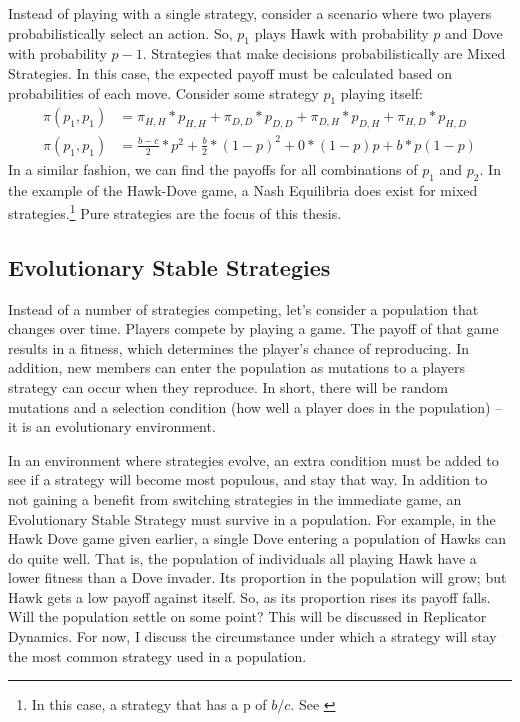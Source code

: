 \documentclass[a4paper,11pt,bcshonoursthesis,singlespace,oneside,thesisdraft,pdflatex]{cssethesis}
\renewcommand{\cite}{\citep} %
\begin{document}
Instead of playing with a single strategy, consider a scenario where two players probabilistically select an action. So, $p_1$ plays Hawk with probability $p$ and Dove with probability $p-1$. Strategies that make decisions probabilistically are Mixed Strategies. 
In this case, the expected payoff must be calculated based on probabilities of each move. 
Consider some strategy $p_1$ playing itself: 
\begin{align}
\label{eqn:probabilities}
\pi(p_1,p_1)&=\pi_{H,H}*p_{H,H}+\pi_{D,D}*p_{D,D}+\pi_{D,H}*p_{D,H}+\pi_{H,D}*p_{H,D}\\
\pi(p_1,p_1)&=\frac{b-c}{2}*p^2+\frac{b}{2}*(1-p)^2+0*(1-p)p+b*p(1-p) \nonumber
\end{align}
In a similar fashion, we can find the payoffs for all combinations of $p_1$ and $p_2$. 
In the example of the Hawk-Dove game, a Nash Equilibria does exist for mixed strategies.\footnote{In this case, a strategy that has a p of $b/c$. See \cite{nowak2006evolutionary63}} Pure strategies are the focus of this thesis.

\subsection{Evolutionary Stable Strategies}
Instead of a number of strategies competing, let's consider a population that changes over time. 
Players compete by playing a game. 
The payoff of that game results in a fitness, which determines the player's chance of reproducing. 
In addition, new members can enter the population as mutations to a players strategy can occur when they reproduce. 
In short, there will be random mutations and a selection condition (how well a player does in the population) -- it is an evolutionary environment. 

In an environment where strategies evolve, an extra condition must be added to see if a strategy will become most populous, and stay that way. 
In addition to not gaining a benefit from switching strategies in the immediate game, an Evolutionary Stable Strategy must survive in a population. 
For example, in the Hawk Dove game given earlier, a single Dove entering a population of Hawks can do quite well. 
That is, the population of individuals all playing Hawk have a lower fitness than a Dove invader. 
Its proportion in the population will grow; but Hawk gets a low payoff against itself. 
So, as its proportion rises its payoff falls. 
Will the population settle on some point? This will be discussed in Replicator Dynamics. 
For now, I discuss the circumstance under which a strategy will stay the most common strategy used in a population. 
\end{document}
